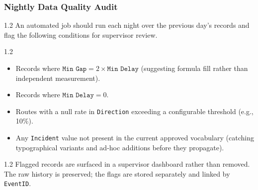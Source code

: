 \documentclass[11pt]{article}
\begin{document}
\subsubsection{Nightly Data Quality Audit}
\vspace{-0.25em}
\begin{spacing}{1.2}
An automated job should run each night over the previous day's records and flag the following
conditions for supervisor review.
\end{spacing}
\vspace{-0.5em}
\begin{spacing}{1.2}
\begin{itemize}[leftmargin=2em, itemsep=3pt, topsep=4pt, parsep=0pt]
    \item Records where $\texttt{Min Gap} = 2 \times \texttt{Min Delay}$ (suggesting formula fill rather than
    independent measurement).
    \item Records where $\texttt{Min Delay} = 0$.
    \item Routes with a null rate in \texttt{Direction} exceeding a configurable threshold (e.g., 10\%).
    \item Any \texttt{Incident} value not present in the current approved vocabulary (catching
    typographical variants and ad-hoc additions before they propagate).
\end{itemize}
\end{spacing}
\vspace{-0.25em}
\begin{spacing}{1.2}
Flagged records are surfaced in a supervisor dashboard rather than removed. The raw history is
preserved; the flags are stored separately and linked by \texttt{EventID}.
\end{spacing}
\end{document}
